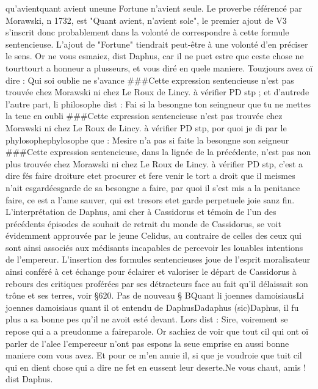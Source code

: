 \documentclass{article}
\begin{document}
\begin{pages}
     qu'avientquant avient  
      uneune Fortune n’avient seule.
   Le proverbe référencé par Morawski, n 1732, est "Quant avient, n'avient sole", le premier ajout de V3 s'inscrit 
   donc probablement dans la volonté de correspondre à cette formule sentencieuse. L'ajout de "Fortune" tiendrait peut-être à une volonté d'en préciser le sens.
   Or ne vous esmaiez, dist Daphus, 
      car il ne puet estre que ceste chose ne tourttourt a honneur a 
      plusseurs, et vous diré en quele maniere. Touzjours avez oï dire : Qui soi oublie ne s’avance
      ###Cette expression sentencieuse n'est pas trouvée chez Morawski ni chez Le Roux de Lincy. à vérifier PD stp ; 
      et d'autrede l'autre part, li philosophe dist : 
      Fai si la besongne ton seingneur que tu ne mettes la teue en oubli
      ###Cette expression sentencieuse n'est pas trouvée chez Morawski ni chez Le Roux de Lincy. à vérifier PD stp, 
      por quoi je di par le phylosophephylosophe que : 
      Mesire n’a pas si faite la besongne son seigneur
      ###Cette expression sentencieuse, dans la lignée de la précédente, 
         n'est pas non plus trouvée chez Morawski ni chez Le Roux de Lincy. à vérifier PD stp, 
      c’est a dire fés faire droiture etet procurer et fere venir 
      le tort a droit que il meismes n’ait esgardéesgarde de 
      sa besongne a faire, par quoi il s’est mis a la penitance faire, ce est a 
      l’ame sauver, qui est tresors etet garde perpetuele joie sanz fin.
   L'interprétation de Daphus, ami cher à Cassidorus et témoin de l'un des précédents épisodes de souhait 
   de retrait du monde de Cassidorus, se voit évidemment approuvée par le jeune Celidus, au contraire de celles des ceux qui sont 
   ainsi associés aux médisants incapables de percevoir les louables intentions de l'empereur. L'insertion des formules sentencieuses 
   joue de l'esprit moralisateur ainsi conféré à cet échange pour éclairer et valoriser le départ de Cassidorus à rebours des 
   critiques proférées par ses détracteurs face au fait qu'il délaissait son trône et ses terres, voir §620. \pend
\pstart Pas de nouveau § BQuant 
   li joennes damoisiausLi joennes damoisiaus quant il ot entendu 
   de DaphusDadaphus (sic)Daphus, 
   il fu plus a sa bonne pes qu’il ne avoit esté devant. Lors dist :
   Sire, voirement se repose qui 
      a a preudonme 
      a faireparole. 
      Or sachiez de voir que tout cil qui ont oï parler de l’alee 
      l’empereeur n’ont pas espons 
   la seue emprise en aussi bonne maniere com vous avez. Et pour ce m’en anuie il, 
   si que je voudroie que tuit cil qui en dient chose qui a dire ne fet en eussent leur deserte.Ne vous chaut, amis ! dist Daphus. 

\end{pages}
\end{document}
